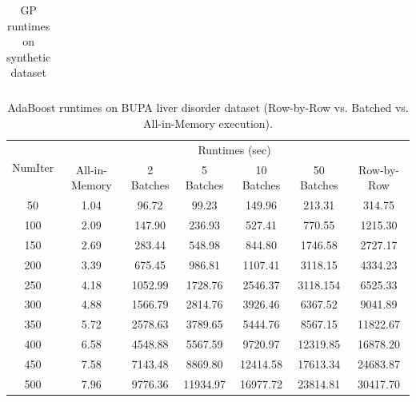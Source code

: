 \begin{table}[!htbp]
\centering
\begin{tabular}{lcc}
\end{tabular}
\caption{GP runtimes on synthetic dataset}
\label{tab:gp}
\end{table}

\begin{table}[!htbp]
\small
\centering
\begin{tabular}{|c|c|c|c|c|c|c|}
\hline
\multirow{2}{*}{NumIter} & \multicolumn{6}{|c|}{Runtimes (sec)}\\
\cline{2-7}
& All-in-Memory & 2 Batches & 5 Batches & 10 Batches & 50 Batches & Row-by-Row\\
\hline
50 &1.04 &96.72 &99.23 &149.96 &213.31 &314.75 \\
\hline
100 &2.09 &147.90 &236.93 &527.41 &770.55 &1215.30 \\
\hline
150 &2.69 &283.44 &548.98 &844.80 &1746.58 &2727.17 \\ 
\hline
200 &3.39 &675.45 &986.81 &1107.41 &3118.15 &4334.23 \\ 
\hline
250 &4.18 &1052.99 &1728.76 &2546.37 &3118.154 &6525.33 \\ 
\hline
300 &4.88 &1566.79 &2814.76 &3926.46 &6367.52 &9041.89 \\ 
\hline
350 &5.72 &2578.63 &3789.65 &5444.76 &8567.15 &11822.67 \\ 
\hline
400 &6.58 &4548.88 &5567.59 &9720.97 &12319.85 &16878.20 \\ 
\hline
450 &7.58 &7143.48 &8869.80 &12414.58 &17613.34 &24683.87 \\ 
\hline
500 &7.96 &9776.36 &11934.97 &16977.72 &23814.81 &30417.70 \\
\hline
\end{tabular}
\caption{AdaBoost runtimes on BUPA liver disorder dataset (Row-by-Row vs. Batched vs. All-in-Memory execution).}
\label{tab:adaBupa1}
\end{table}

